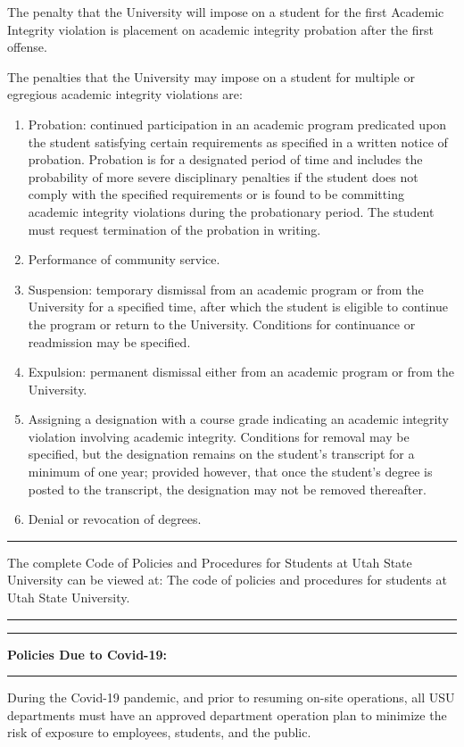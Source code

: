 \documentclass[10pt,fleqn]{article}
\begin{document}
The penalty that the University will impose on a student for the first Academic
Integrity violation is placement on academic integrity probation after the first
offense.

The penalties that the University may impose on a student for multiple or
egregious academic integrity violations are:
\begin{enumerate}
  \item Probation: continued participation in an academic program predicated
        upon the student satisfying certain requirements as specified in a
        written notice of probation. Probation is for a designated period of
        time and includes the probability of more severe disciplinary penalties
        if the student does not comply with the specified requirements or is
        found to be committing academic integrity violations during the
        probationary period. The student must request termination of the
        probation in writing.
  \item Performance of community service.
  \item Suspension: temporary dismissal from an academic program or from the
        University for a specified time, after which the student is eligible to
        continue the program or return to the University. Conditions for
        continuance or readmission may be specified.
  \item Expulsion: permanent dismissal either from an academic program or from
        the University.
  \item Assigning a designation with a course grade indicating an academic
        integrity violation involving academic integrity. Conditions for removal
        may be specified, but the designation remains on the student's
        transcript for a minimum of one year; provided however, that once the
        student's degree is posted to the transcript, the designation may not be
        removed thereafter.
  \item Denial or revocation of degrees.
\end{enumerate}
\vskip0.1in\hrule\vskip0.1in\noindent
The complete Code of Policies and Procedures for Students at Utah State
University can be viewed at: The code of policies and procedures for students at
Utah State University.
\vskip0.1in\hrule\vskip0.1in
\newpage
\vskip0.1in\hrule\vskip0.1in
\noindent
{\bf Policies Due to Covid-19:}
\vskip0.1in\hrule\vskip0.1in \noindent
During the Covid-19 pandemic, and prior to resuming on-site operations, all USU
departments must have an approved department operation plan to minimize the
risk of exposure to employees, students, and the public. 
\end{document}
